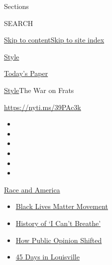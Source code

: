 Sections

SEARCH

\protect\hyperlink{site-content}{Skip to
content}\protect\hyperlink{site-index}{Skip to site index}

\href{https://www.nytimes3xbfgragh.onion/section/style}{Style}

\href{https://myaccount.nytimes3xbfgragh.onion/auth/login?response_type=cookie\&client_id=vi}{}

\href{https://www.nytimes3xbfgragh.onion/section/todayspaper}{Today's
Paper}

\href{/section/style}{Style}\textbar{}The War on Frats

\url{https://nyti.ms/39PAc3k}

\begin{itemize}
\item
\item
\item
\item
\item
\item
\end{itemize}

\href{https://www.nytimes3xbfgragh.onion/news-event/george-floyd-protests-minneapolis-new-york-los-angeles?action=click\&pgtype=Article\&state=default\&region=TOP_BANNER\&context=storylines_menu}{Race
and America}

\begin{itemize}
\tightlist
\item
  \href{https://www.nytimes3xbfgragh.onion/interactive/2020/07/03/us/george-floyd-protests-crowd-size.html?action=click\&pgtype=Article\&state=default\&region=TOP_BANNER\&context=storylines_menu}{Black
  Lives Matter Movement}
\item
  \href{https://www.nytimes3xbfgragh.onion/interactive/2020/06/28/us/i-cant-breathe-police-arrest.html?action=click\&pgtype=Article\&state=default\&region=TOP_BANNER\&context=storylines_menu}{History
  of `I Can't Breathe'}
\item
  \href{https://www.nytimes3xbfgragh.onion/interactive/2020/06/10/upshot/black-lives-matter-attitudes.html?action=click\&pgtype=Article\&state=default\&region=TOP_BANNER\&context=storylines_menu}{How
  Public Opinion Shifted}
\item
  \href{https://www.nytimes3xbfgragh.onion/interactive/2020/07/16/us/black-lives-matter-protests-louisville-breonna-taylor.html?action=click\&pgtype=Article\&state=default\&region=TOP_BANNER\&context=storylines_menu}{45
  Days in Louisville}
\end{itemize}

